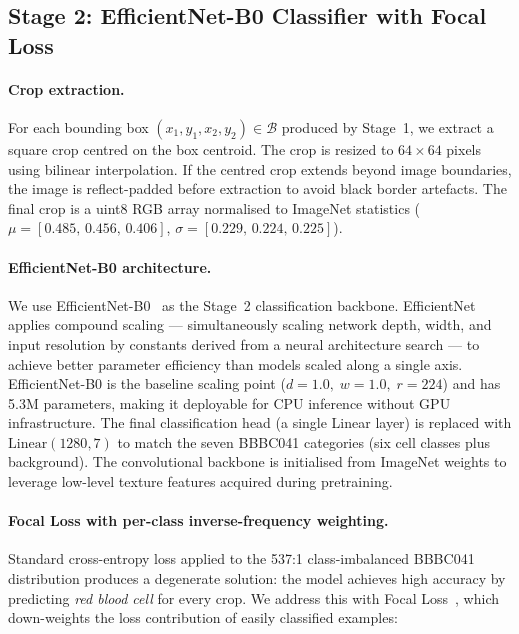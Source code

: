\documentclass[10pt,twocolumn]{article}
\begin{document}
\subsection{Stage 2: EfficientNet-B0 Classifier with Focal Loss}
\label{ssec:stage2}

\paragraph{Crop extraction.}
For each bounding box $(x_1, y_1, x_2, y_2) \in \mathcal{B}$ produced by
Stage~1, we extract a square crop centred on the box centroid. The crop
is resized to $64 \times 64$ pixels using bilinear interpolation. If the
centred crop extends beyond image boundaries, the image is reflect-padded
before extraction to avoid black border artefacts. The final crop is a
uint8 RGB array normalised to ImageNet statistics ($\mu = [0.485,\,0.456,\,0.406]$,
$\sigma = [0.229,\,0.224,\,0.225]$).

\paragraph{EfficientNet-B0 architecture.}
We use EfficientNet-B0~\cite{tan2019} as the Stage~2 classification
backbone. EfficientNet applies compound scaling --- simultaneously scaling
network depth, width, and input resolution by constants derived from a
neural architecture search --- to achieve better parameter efficiency than
models scaled along a single axis. EfficientNet-B0 is the baseline scaling
point ($d=1.0,\;w=1.0,\;r=224$) and has 5.3M parameters, making it
deployable for CPU inference without GPU infrastructure. The final
classification head (a single Linear layer) is replaced with
$\text{Linear}(1280, 7)$ to match the seven BBBC041 categories (six cell
classes plus background). The convolutional backbone is initialised from
ImageNet weights to leverage low-level texture features acquired during
pretraining.

\paragraph{Focal Loss with per-class inverse-frequency weighting.}
Standard cross-entropy loss applied to the 537:1 class-imbalanced BBBC041
distribution produces a degenerate solution: the model achieves high
accuracy by predicting \textit{red blood cell} for every crop. We address
this with Focal Loss~\cite{lin2017focal}, which down-weights the loss
contribution of easily classified examples:
\end{document}
